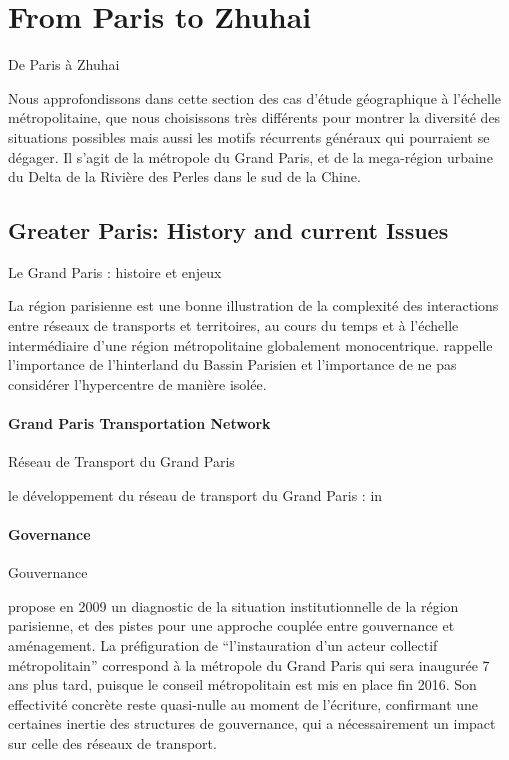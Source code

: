 



\newpage

\section[From Paris to Zhuhai][De Paris à Zhuhai]{From Paris to Zhuhai}{De Paris à Zhuhai}

\label{sec:casestudies}



Nous approfondissons dans cette section des cas d'étude géographique à l'échelle métropolitaine, que nous choisissons très différents pour montrer la diversité des situations possibles mais aussi les motifs récurrents généraux qui pourraient se dégager. Il s'agit de la métropole du Grand Paris, et de la mega-région urbaine du Delta de la Rivière des Perles dans le sud de la Chine.



\subsection[Greater Paris][Grand Paris]{Greater Paris: History and current Issues}{Le Grand Paris : histoire et enjeux}


La région parisienne est une bonne illustration de la complexité des interactions entre réseaux de transports et territoires, au cours du temps et à l'échelle intermédiaire d'une région métropolitaine globalement monocentrique. \cite{gilli2005bassin} rappelle l'importance de l'hinterland du Bassin Parisien et l'importance de ne pas considérer l'hypercentre de manière isolée.




\paragraph{Grand Paris Transportation Network}{Réseau de Transport du Grand Paris}

le développement du réseau de transport du Grand Paris : in\cite{beauguitte:halshs-01068589}

\paragraph{Governance}{Gouvernance}

\cite{gilli2009paris} propose en 2009 un diagnostic de la situation institutionnelle de la région parisienne, et des pistes pour une approche couplée entre gouvernance et aménagement. La préfiguration de ``l'instauration d'un acteur collectif métropolitain'' correspond à la métropole du Grand Paris qui sera inaugurée 7 ans plus tard, puisque le conseil métropolitain est mis en place fin 2016. Son effectivité concrète reste quasi-nulle au moment de l'écriture, confirmant une certaines inertie des structures de gouvernance, qui a nécessairement un impact sur celle des réseaux de transport. 


